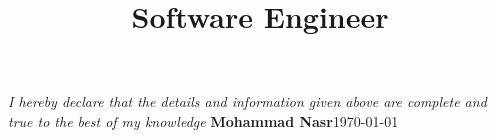 \documentclass[11pt, a4paper, color, final]{moderncv}
\title{Software Engineer}
\begin{document}
\maketitle












\emptysection{}\closesection{}
\vfill
\textit{I hereby declare that the details and information given above are complete and true to the best of my knowledge}
\linebreak
\textbf{Mohammad Nasr}\hfil\today
\end{document}
